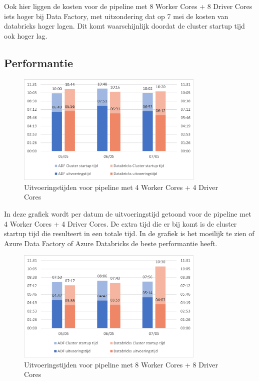 Ook hier liggen de kosten voor de pipeline met 8 Worker Cores + 8 Driver Cores iets hoger bij Data Factory, met uitzondering dat op 7 mei de kosten van databricks hoger lagen. Dit komt waarschijnlijk doordat de cluster startup tijd ook hoger lag.

\subsection{Performantie}

\begin{figure}[H]
    \centering
    \includegraphics[width=0.8\textwidth]{./graphics/kosten/graf3.png}
    \caption{Uitvoeringstijden voor pipeline met 4 Worker Cores + 4 Driver Cores}
\end{figure}

In deze grafiek wordt per datum de uitvoeringstijd getoond voor de pipeline met 4 Worker Cores + 4 Driver Cores. De extra tijd die er bij komt is de cluster startup tijd die resulteert in een totale tijd. In de grafiek is het moeilijk te zien of Azure Data Factory of Azure Databricks de beste performantie heeft.

\begin{figure}[H]
    \centering
    \includegraphics[width=0.8\textwidth]{./graphics/kosten/graf4.png}
    \caption{Uitvoeringstijden voor pipeline met 8 Worker Cores + 8 Driver Cores}
\end{figure}

